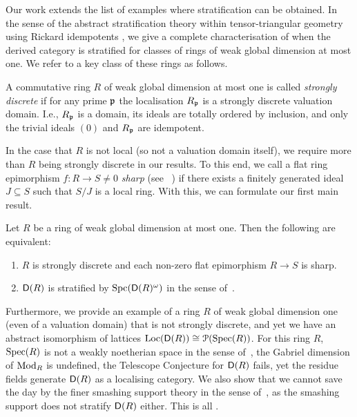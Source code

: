 \documentclass[reqno,a4paper]{amsart}
\begin{document}
Our work extends the list of examples where stratification can be obtained. %
In the sense of the abstract stratification theory within tensor-triangular geometry using Rickard idempotents \cite{ric97,balmerfavi_idempotents,bhs23}, we give a complete characterisation of when the derived category is stratified for classes of rings of weak global dimension at most one. We refer to a key class of these rings as follows.
\begin{definition*}
    A commutative ring $R$ of weak global dimension at most one is called {\it strongly discrete} if for any prime $\mathfrak{p}$ the localisation $R_{\mathfrak{p}}$ is a strongly discrete valuation domain.
    I.e., $R_{\mathfrak{p}}$ is a domain, its ideals are totally ordered by inclusion, and only the trivial ideals $(0)$ and $R_{\mathfrak{p}}$ are idempotent.

In the case that $R$ is not local (so not a valuation domain itself), we require more than $R$ being strongly discrete in our results. To this end, we call a flat ring epimorphism $f\colon R\to S\neq0$ {\it sharp} (see \ ) if there exists
a finitely generated ideal $J\subseteq S$ such that $S/J$
is a local ring. With this, we can formulate our first main result.
\end{definition*}
\begin{theorem*}
    Let $R$ be a ring of weak global dimension at most one. Then the following are equivalent:
    \begin{enumerate}
        \item $R$ is strongly discrete and each non-zero flat epimorphism $R\to S$ is sharp.
        \item $\mathsf{D}(R)$ is stratified by $\operatorname{Spc}(\mathsf{D}(R)^\omega)$ in the sense of~\cite{bhs23}.
    \end{enumerate}
\end{theorem*}
Furthermore, we provide an example of a ring $R$ of weak global dimension one (even of a valuation domain) that is not strongly discrete, and yet we have an abstract isomorphism of lattices $\operatorname{Loc}(\mathsf{D}(R))\cong\operatorname{\mathcal{P}}(\operatorname{Spec}(R))$. 
For this ring $R$, $\operatorname{Spec}(R)$ is not a weakly noetherian space in the sense of~\cite{bhs23}, the Gabriel dimension of $\operatorname{Mod}_R$ is undefined, the Telescope Conjecture for $\mathsf{D}(R)$ fails, yet the residue fields generate $\mathsf{D}(R)$ as a localising category. 
We also show that we cannot save the day by the finer smashing support theory in the sense of~\cite{bigspectra}, as the smashing support does not stratify $\mathsf{D}(R)$ either. This is all . 
\end{document}
